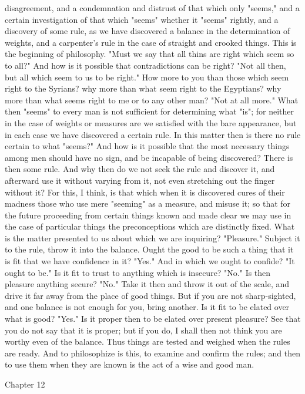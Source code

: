 \documentclass[a4paper]{article}
\begin{document}
disagreement, and a condemnation and distrust of that which only "seems," and a
certain investigation of that which "seems" whether it "seems" rightly, and a
discovery of some rule, as we have discovered a balance in the determination of
weights, and a carpenter's rule in the case of straight and crooked things.
This is the beginning of philosophy. "Must we say that all thins are right
which seem so to all?" And how is it possible that contradictions can be right?
"Not all then, but all which seem to us to be right." How more to you than
those which seem right to the Syrians? why more than what seem right to the
Egyptians? why more than what seems right to me or to any other man? "Not at
all more." What then "seems" to every man is not sufficient for determining
what "is"; for neither in the case of weights or measures are we satisfied with
the bare appearance, but in each case we have discovered a certain rule. In
this matter then is there no rule certain to what "seems?" And how is it
possible that the most necessary things among men should have no sign, and be
incapable of being discovered? There is then some rule. And why then do we not
seek the rule and discover it, and afterward use it without varying from it,
not even stretching out the finger without it? For this, I think, is that which
when it is discovered cures of their madness those who use mere "seeming" as a
measure, and misuse it; so that for the future proceeding from certain things
known and made clear we may use in the case of particular things the
preconceptions which are distinctly fixed.
    What is the matter presented to us about which we are inquiring?
"Pleasure." Subject it to the rule, throw it into the balance. Ought the good
to be such a thing that it is fit that we have confidence in it? "Yes." And in
which we ought to confide? "It ought to be." Is it fit to trust to anything
which is insecure? "No." Is then pleasure anything secure? "No." Take it then
and throw it out of the scale, and drive it far away from the place of good
things. But if you are not sharp-sighted, and one balance is not enough for
you, bring another. Is it fit to be elated over what is good? "Yes." Is it
proper then to be elated over present pleasure? See that you do not say that it
is proper; but if you do, I shall then not think you are worthy even of the
balance. Thus things are tested and weighed when the rules are ready. And to
philosophize is this, to examine and confirm the rules; and then to use them
when they are known is the act of a wise and good man.

Chapter 12
\end{document}
